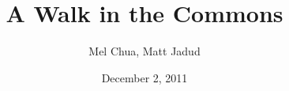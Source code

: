 \documentclass{beamer}
\title{A Walk in the Commons}
\author{Mel Chua, Matt Jadud}
\date{December 2, 2011}
\begin{document}
\titlepage

\begin{comment}
* What is open / what are open communities?
** What's open source/content?
** some projects you may have heard of (Firefox, Wikipedia, etc)
** some you may not have (Wikiotics, CivX, FreeCiv, Civicommons, Sahana, CiviCRM)
** it's not just Linux - a lot of this stuff runs on other platforms too (Windows, Mac, web-based) "no, we are not trying to get you to reinstall your computer" (but if you're interested, we're happy to help)
** the Four Freedoms (made for software)
*** Freedom / friends / ?
** creative commons (made for content)
** it's more than licensing... what's "the open source way," some characteristics of those communities (realtime transparency, etc)
\end{comment}

\begin{comment}
* What can your students do?
** One example (pick one - Fedora & your first-year class)
** Documentation
** Translation
** Gardening
** Bug fixing
** Testing
** Artwork/design
** Marketing/outreach
** Being active and vocal users (use open source in outreach/service projects - for instance, Mo & the Girl Scouts) / advocacy
** Legal/licensing work (very, *very* basic stuff)
** it's the non-programming skills that are usually in most need by these communities, because nobody knows about them / how to do them, so you can almost become domain "experts" in a project
** Creative repurposing - bringing a project into a new domain it wasn't necessarily originally designed for
\end{comment}

\begin{comment}
Researchers: they exist! (10 seconds each, no more.)
* coleman - ethics in foss communities
* krafft - innovation diffusion
* benkler - "law stuff"
* von hippel - economics
* lawler - wikiversity formation
* dennys and martin - semantic mediawiki
* davis and jabeen - legitimate peripheral participation
* government adoption paper whose author name I forgot
* Mini Case Study: CC licensed video in Zach's research
\end{comment}

\begin{comment}
* What can you do?
**  Who's there to help you?
** Who's working on this?
\end{comment}

\begin{comment}
* Why make the connection?
** Legitimate Peripheral Participation & situated learning
*** Students can engage -- the currency is desire and energy
** Community of educators
*** Local (institutional)
*** Global (distributed)
*** A community of practice as opposed to a research community
\end{comment}
\end{document}
